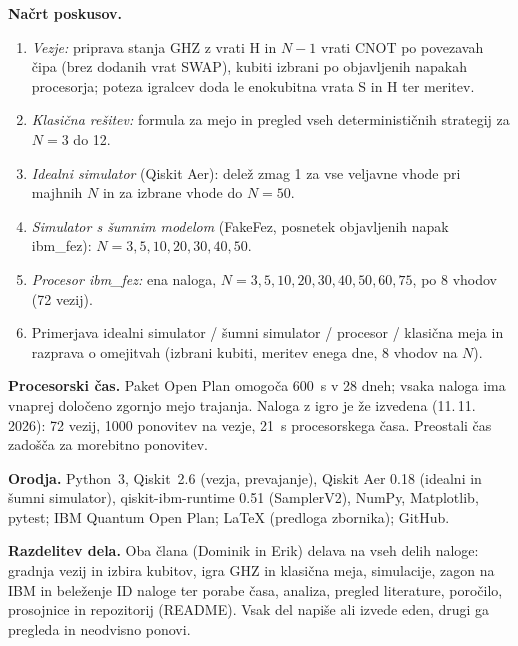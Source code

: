 \documentclass[10pt,a4paper]{article}
\begin{document}
\textbf{Načrt poskusov.}
\begin{enumerate}
\item \emph{Vezje:} priprava stanja GHZ z vrati H in $N-1$ vrati CNOT po povezavah čipa (brez dodanih vrat SWAP), kubiti
      izbrani po objavljenih napakah procesorja; poteza igralcev doda le enokubitna vrata S in H ter meritev.
\item \emph{Klasična rešitev:} formula za mejo in pregled vseh determinističnih strategij za $N=3$ do 12.
\item \emph{Idealni simulator} (Qiskit Aer): delež zmag 1 za vse veljavne vhode pri majhnih $N$ in za izbrane vhode do $N=50$.
\item \emph{Simulator s šumnim modelom} (FakeFez, posnetek objavljenih napak ibm\_fez): $N=3, 5, 10, 20, 30, 40, 50$.
\item \emph{Procesor ibm\_fez:} ena naloga, $N=3, 5, 10, 20, 30, 40, 50, 60, 75$, po 8 vhodov (72 vezij).
\item Primerjava idealni simulator / šumni simulator / procesor / klasična meja in razprava o omejitvah (izbrani kubiti,
      meritev enega dne, 8 vhodov na $N$).
\end{enumerate}

\textbf{Procesorski čas.} Paket Open Plan omogoča 600~s v 28 dneh; vsaka naloga ima vnaprej določeno zgornjo mejo trajanja.
Naloga z igro je že izvedena (11.\,11.\,2026): 72 vezij, 1000 ponovitev na vezje, 21~s procesorskega časa. Preostali čas
zadošča za morebitno ponovitev.

\textbf{Orodja.} Python~3, Qiskit~2.6 (vezja, prevajanje), Qiskit Aer 0.18 (idealni in šumni simulator), qiskit-ibm-runtime
0.51 (SamplerV2), NumPy, Matplotlib, pytest; IBM Quantum Open Plan; \LaTeX{} (predloga zbornika); GitHub.\par

\textbf{Razdelitev dela.} Oba člana (Dominik in Erik) delava na vseh delih naloge: gradnja vezij in izbira kubitov, igra GHZ in
klasična meja, simulacije, zagon na IBM in beleženje ID naloge ter porabe časa, analiza, pregled literature, poročilo,
prosojnice in repozitorij (README). Vsak del napiše ali izvede eden, drugi ga pregleda in neodvisno ponovi.
\end{document}
